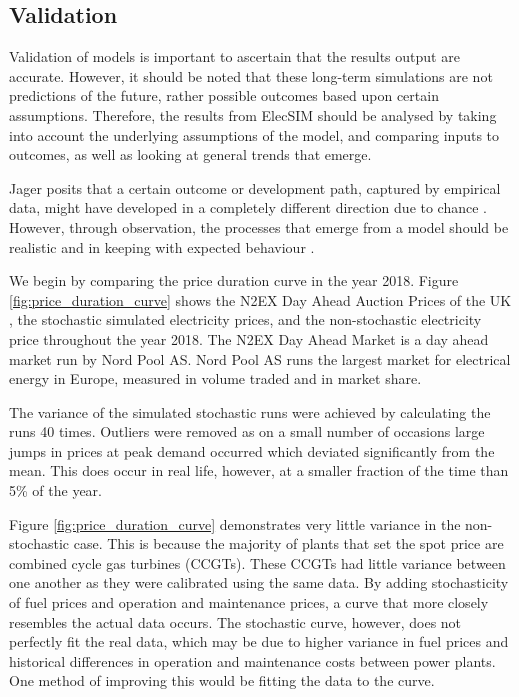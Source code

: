 
\subsection{Validation} Validation of models is important to ascertain that the results output are accurate. However, it should be noted that these long-term simulations are not predictions of the future, rather possible outcomes based upon certain assumptions. Therefore, the results from ElecSIM should be analysed by taking into account the underlying assumptions of the model, and comparing inputs to outcomes, as well as looking at general trends that emerge.

Jager posits that a certain outcome or development path, captured by empirical data, might have developed in a completely different direction due to chance \cite{Jager2006a}. However, through observation, the processes that emerge from a model should be realistic and in keeping with expected behaviour \cite{Jager2006}.

We begin by comparing the price duration curve in the year 2018. Figure \ref{fig:price_duration_curve} shows the N2EX Day Ahead Auction Prices of the UK \cite{nordpool_2019}, the stochastic simulated electricity prices, and the non-stochastic electricity price throughout the year 2018. The N2EX Day Ahead Market is a day ahead market run by Nord Pool AS. Nord Pool AS runs the largest market for electrical energy in Europe, measured in volume traded and in market share.

The variance of the simulated stochastic runs were achieved by calculating the runs 40 times. Outliers were removed as on a small number of occasions large jumps in prices at peak demand occurred which deviated significantly from the mean. This does occur in real life, however, at a smaller fraction of the time than 5\% of the year.

Figure \ref{fig:price_duration_curve} demonstrates very little variance in the non-stochastic case. This is because the majority of plants that set the spot price are combined cycle gas turbines (CCGTs). These CCGTs had little variance between one another as they were calibrated using the same data. By adding stochasticity of fuel prices and operation and maintenance prices, a curve that more closely resembles the actual data occurs. The stochastic curve, however, does not perfectly fit the real data, which may be due to higher variance in fuel prices and historical differences in operation and maintenance costs between power plants. One method of improving this would be fitting the data to the curve.

